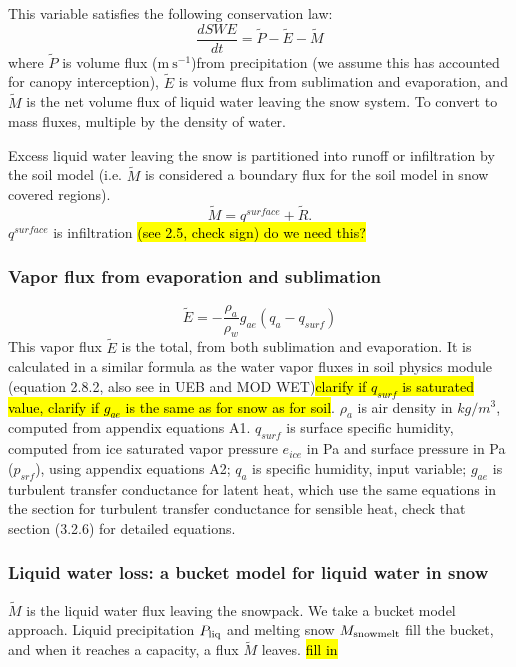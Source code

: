 \documentclass{article}
\begin{document}
This variable satisfies the following conservation law:
\begin{equation}
\frac{dSWE}{dt} = \tilde{P} - \tilde{E} - \tilde{M}
\end{equation}
where $\tilde{P}$ is volume flux ($\mathrm{m~s^{-1}}$)from precipitation (we assume this has accounted for canopy interception), $\tilde{E}$ is volume flux from sublimation and evaporation, and $\tilde{M}$ is the net volume flux of liquid water leaving the snow system. To convert to mass fluxes, multiple by the density of water.

Excess liquid water leaving the snow is partitioned into runoff or infiltration by the soil model (i.e. $\tilde{M}$ is considered a boundary flux for the soil model in snow covered regions).
\begin{equation}
\tilde{M} = q^{surface} + \tilde{R}.
\end{equation}
$q^{surface}$ is infiltration \hl{(see 2.5, check sign) do we need this?}

\subsubsection{Vapor flux from evaporation and sublimation}
\begin{equation}
\tilde{E}=  -\frac{\rho_a}{\rho_w}g_{ae}(q_a-q_{surf})
\end{equation} 
This vapor flux $\tilde{E}$ is the total, from both sublimation and evaporation. It is calculated in a similar formula as the water vapor fluxes in soil physics module (equation 2.8.2, also see in UEB and MOD WET)\hl{clarify if $q_{surf}$ is saturated value, clarify if $g_{ae}$ is the same as for snow as for soil}.  $\rho_a$ is air density in $kg/m^3$, computed from appendix equations A1. $q_{surf}$ is surface specific humidity, computed from ice saturated vapor pressure $e_{ice}$ in Pa and surface pressure in Pa ($p_{srf}$), using appendix equations A2; $q_a$ is specific humidity, input variable; $g_{ae}$ is turbulent transfer conductance for latent heat, which use the same equations in the section for turbulent transfer conductance for sensible heat, check that section (3.2.6) for detailed equations.


\subsubsection{Liquid water loss: a bucket model for liquid water in snow}
$\tilde{M}$ is the liquid water flux leaving the snowpack. We take a bucket model approach. Liquid precipitation $P_{\rm liq}$ and melting snow $M_{\rm snowmelt}$ fill the bucket, and when it reaches a capacity, a flux $\tilde{M}$ leaves.
\hl{fill in}
\end{document}
